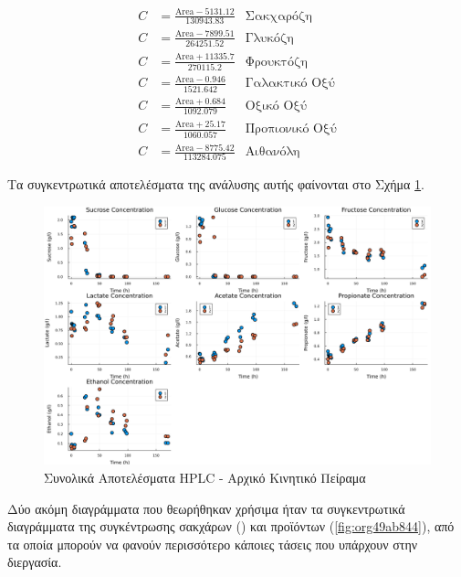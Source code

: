 \documentclass[11pt]{report}
\begin{document}
\begin{enumerate}
\begin{subequations}
\label{eqn:hplc-calibration}
\begin{align}
C &= \frac{\text{Area} - 5131.12}{130943.83} & \text{Σακχαρόζη} \label{eqn:hplc-sucrose} \\
C &= \frac{\text{Area} - 7899.51}{264251.52} & \text{Γλυκόζη} \label{eqn:hplc-glucose} \\
C &= \frac{\text{Area} + 11335.7}{270115.2} & \text{Φρουκτόζη} \label{eqn:hplc-fructose} \\
C &= \frac{\text{Area} - 0.946}{1521.642} & \text{Γαλακτικό Οξύ} \label{eqn:hplc-lactate} \\
C &= \frac{\text{Area} + 0.684}{1092.079} & \text{Οξικό Οξύ} \label{eqn:hplc-acetate} \\
C &= \frac{\text{Area} + 25.17}{1060.057} & \text{Προπιονικό Οξύ} \label{eqn:hplc-propionate} \\
C &= \frac{\text{Area} - 8775.42}{113284.075} & \text{Αιθανόλη} \label{eqn:hplc-ethanol}
\end{align}
\end{subequations}

Τα συγκεντρωτικά αποτελέσματα της ανάλυσης αυτής φαίνονται στο Σχήμα \ref{fig:org1a790c4}. 

\begin{figure}[htbp]
\centering
\includegraphics[width=.9\linewidth]{../plots/23_10/final_scatter_23_10.png}
\caption{\label{fig:org1a790c4}Συνολικά Αποτελέσματα HPLC - Αρχικό Κινητικό Πείραμα}
\end{figure}

Δύο ακόμη διαγράμματα που θεωρήθηκαν χρήσιμα ήταν τα συγκεντρωτικά διαγράμματα της συγκέντρωσης σακχάρων () και προϊόντων (\ref{fig:org49ab844}), από τα οποία μπορούν να φανούν περισσότερο κάποιες τάσεις που υπάρχουν στην διεργασία.


\end{enumerate}
\end{document}
